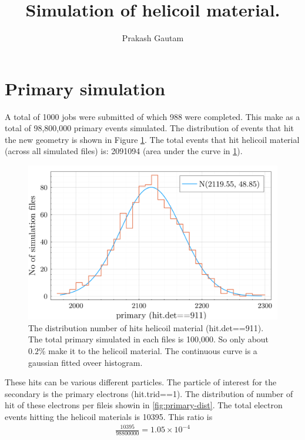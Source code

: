 \documentclass[a4paper,12pt]{article}
\title{Simulation of helicoil material.}
\author{Prakash Gautam}
\begin{document}
    \maketitle
\section{Primary simulation}
    A total of 1000 jobs were submitted of which 988 were completed. This make as a total of 98,800,000 primary events simulated.  The distribution of events that hit the new geometry is shown in Figure \ref{fig:primary-hit-det}. The total events that hit helicoil material (across all simulated files) is: 2091094 (area under the curve in \ref{fig:primary-hit-det}).

    
    \begin{figure}[h!]
        \centering
        \includegraphics[width=1\linewidth]{image/helicoil-20221121-113016-img-primary-det-hit-count-hist-not-normalized.png}
        \caption{The distribution number of hits helicoil material (hit.det==911). The total primary simulated in each files is 100,000. So only about $0.2$\% make it to the helicoil material. The continuous curve is a gaussian fitted oveer histogram.}
        \label{fig:primary-hit-det}
    \end{figure}


    These hits can be various different particles. The particle of interest for the secondary is the primary electrons (hit.trid==1).  The distribution of number of hit of these electrons per fileis showin in \ref{fig:primary-dist}. The total electron events hitting the helicoil materials is 10395. This ratio is
    \begin{align*}
        \frac{10395}{98800000} = 1.05 \times 10^{-4}
    \end{align*}
\end{document}
